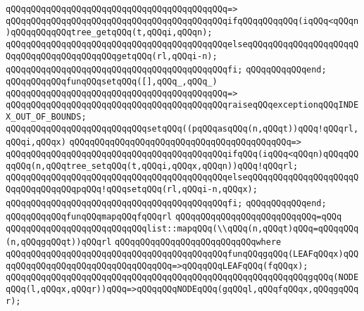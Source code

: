 \verb|qQQqqQQqqQQqqQQqqQQqqQQqqQQqqQQqqQQqqQQqqQQq=>|\newline
\verb|qQQqqQQqqQQqqQQqqQQqqQQqqQQqqQQqqQQqqQQqqQQqifqQQqqQQqqQQq(iqQQq<qQQqn)qQQqqQQqqQQqtree_getqQQq(t,qQQqi,qQQqn);|\newline
\verb|qQQqqQQqqQQqqQQqqQQqqQQqqQQqqQQqqQQqqQQqqQQqelseqQQqqQQqqQQqqQQqqQQqqQQqqQQqqQQqqQQqqQQqqQQqgetqQQq(rl,qQQqi-n);|\newline
\verb|qQQqqQQqqQQqqQQqqQQqqQQqqQQqqQQqqQQqqQQqqQQqfi;|\newline
\verb|qQQqqQQqqQQqend;|\newline
\newline
\verb|qQQqqQQqqQQqfunqQQqsetqQQq([],qQQq_,qQQq_)|\newline
\verb|qQQqqQQqqQQqqQQqqQQqqQQqqQQqqQQqqQQqqQQqqQQq=>|\newline
\verb|qQQqqQQqqQQqqQQqqQQqqQQqqQQqqQQqqQQqqQQqqQQqraiseqQQqexceptionqQQqINDEX_OUT_OF_BOUNDS;|\newline
\newline
\verb|qQQqqQQqqQQqqQQqqQQqqQQqqQQqsetqQQq((pqQQqasqQQq(n,qQQqt))qQQq!qQQqrl,qQQqi,qQQqx)|\newline
\verb|qQQqqQQqqQQqqQQqqQQqqQQqqQQqqQQqqQQqqQQqqQQq=>|\newline
\verb|qQQqqQQqqQQqqQQqqQQqqQQqqQQqqQQqqQQqqQQqqQQqifqQQq(iqQQq<qQQqn)qQQqqQQqqQQq(n,qQQqtree_setqQQq(t,qQQqi,qQQqx,qQQqn))qQQq!qQQqrl;|\newline
\verb|qQQqqQQqqQQqqQQqqQQqqQQqqQQqqQQqqQQqqQQqqQQqelseqQQqqQQqqQQqqQQqqQQqqQQqqQQqqQQqqQQqpqQQq!qQQqsetqQQq(rl,qQQqi-n,qQQqx);|\newline
\verb|qQQqqQQqqQQqqQQqqQQqqQQqqQQqqQQqqQQqqQQqqQQqfi;|\newline
\verb|qQQqqQQqqQQqend;|\newline
\newline
\verb|qQQqqQQqqQQqfunqQQqmapqQQqfqQQqrl|\newline
\verb|qQQqqQQqqQQqqQQqqQQqqQQqqQQq=qQQq|\newline
\verb|qQQqqQQqqQQqqQQqqQQqqQQqqQQqlist::mapqQQq(\\qQQq(n,qQQqt)qQQq=qQQqqQQq(n,qQQqgqQQqt))qQQqrl|\newline
\verb|qQQqqQQqqQQqqQQqqQQqqQQqqQQqwhere|\newline
\verb|qQQqqQQqqQQqqQQqqQQqqQQqqQQqqQQqqQQqqQQqqQQqfunqQQqgqQQq(LEAFqQQqx)qQQqqQQqqQQqqQQqqQQqqQQqqQQqqQQqqQQq=>qQQqqQQqLEAFqQQq(fqQQqx);|\newline
\verb|qQQqqQQqqQQqqQQqqQQqqQQqqQQqqQQqqQQqqQQqqQQqqQQqqQQqqQQqqQQqgqQQq(NODEqQQq(l,qQQqx,qQQqr))qQQq=>qQQqqQQqNODEqQQq(gqQQql,qQQqfqQQqx,qQQqgqQQqr);|\newline
